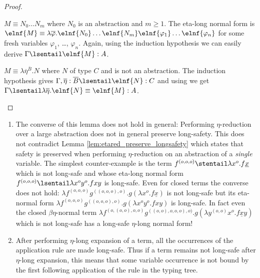 \begin{proof}
\begin{compactitem}
\item $M \equiv N_0 \ldots N_m$ where $N_0$ is an abstraction and $m\geq 1$.
The eta-long normal form is $\elnf{M} \equiv \lambda \overline{\varphi}. \elnf{N_0} \ldots \elnf{N_m} \elnf{\varphi_1}  \ldots \elnf{\varphi_n}$ for some fresh variables $\varphi_1$, \ldots, $\varphi_n$. Again, using the induction hypothesis we can easily derive $\Gamma \lsentail
 \elnf{M} : A$.

\item $M \equiv \lambda \overline{\eta}^{\overline{B}} . N $ where
$N$ of type $C$ and is not an abstraction. The induction hypothesis gives $\Gamma,
  \overline{\eta} : \overline{B} \lsentail \elnf{N} : C$ and using
 we get $\Gamma \lsentail \lambda \overline{\eta} . \elnf{N} \equiv \elnf{M} : A$.  \qedhere
\end{compactitem}
\end{proof}

\begin{remark}\hfill
\begin{enumerate}
\item
The converse of this lemma does not hold in general: Performing
$\eta$-reduction over a large abstraction does not in general
preserve long-safety. This does not contradict Lemma
  \ref{lem:etared_preserve_longsafety} which states that safety is
  preserved when performing $\eta$-reduction on an abstraction
  of a \emph{single} variable. The simplest counter-example is
  the
 term $f^{(o,o,o)} \stentail \lambda x^o . f \underline{x}$ which is not long-safe and
whose eta-long normal form $f^{(o,o,o)} \lsentail \lambda x^o y^o .
f x y$ is long-safe. Even for closed terms the converse does not
hold: $\lambda f^{(o,o,o)} g^{((o,o,o),o)} . g(\lambda x^o . f
\underline{x})$ is not long-safe but its eta-normal form $\lambda f^{(o,o,o)}
g^{((o,o,o),o)} . g(\lambda x^o y^o. f x y)$ is long-safe. In fact
even the closed $\beta\eta$-normal term $\lambda
f^{(o,(o,o),o,o)} g^{((o,o),o,o,o),o)} . g(\lambda y^{(o,o)} x^o
. f \underline{x} y)$ which is not long-safe has a long-safe $\eta$-long normal form!

  \item After performing $\eta$-long expansion of a term, all the occurrences of the application rule are made long-safe. Thus if a term remains not long-safe after $\eta$-long expansion, this means that
  some variable occurrence is not bound by the
  first following application of the  rule in the
  typing tree.
  \end{enumerate}
\end{remark}

